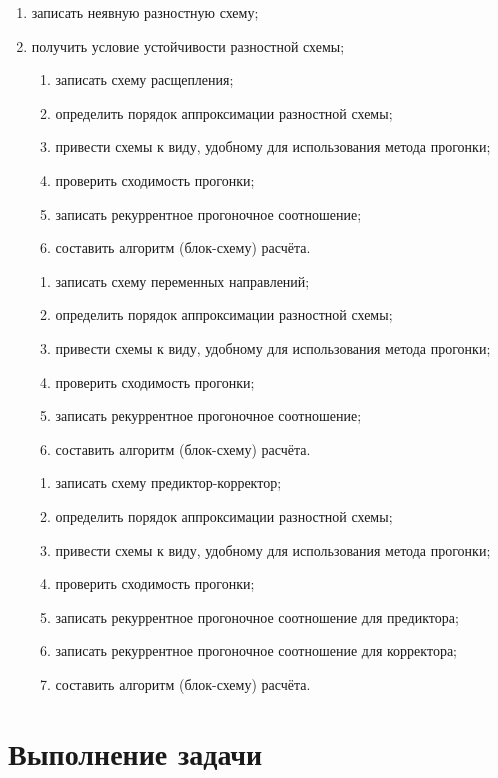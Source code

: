 \documentclass[12pt, a4paper]{report}
\begin{document}
	\begin{enumerate}
		\item записать неявную разностную схему;
		\item получить условие устойчивости разностной схемы;
		\begin{enumerate}
			\item записать схему расщепления;
			\item определить порядок аппроксимации разностной схемы;
			\item привести схемы к виду, удобному для использования метода прогонки;
			\item проверить сходимость прогонки;
			\item записать рекуррентное прогоночное соотношение;
			\item составить алгоритм (блок-схему) расчёта.
		\end{enumerate}
		\begin{enumerate}
			\item записать схему переменных направлений;
			\item определить порядок аппроксимации разностной схемы;
			\item привести схемы к виду, удобному для использования метода прогонки;
			\item проверить сходимость прогонки;
			\item записать рекуррентное прогоночное соотношение;
			\item составить алгоритм (блок-схему) расчёта.
		\end{enumerate}
		\begin{enumerate}
			\item записать схему предиктор-корректор;
			\item определить порядок аппроксимации разностной схемы;
			\item привести схемы к виду, удобному для использования метода прогонки;
			\item проверить сходимость прогонки;
			\item записать рекуррентное прогоночное соотношение для предиктора;
			\item записать рекуррентное прогоночное соотношение для корректора;
			\item составить алгоритм (блок-схему) расчёта.
		\end{enumerate}
	\end{enumerate}

	\newpage

	\section*{Выполнение задачи}
\end{document}
